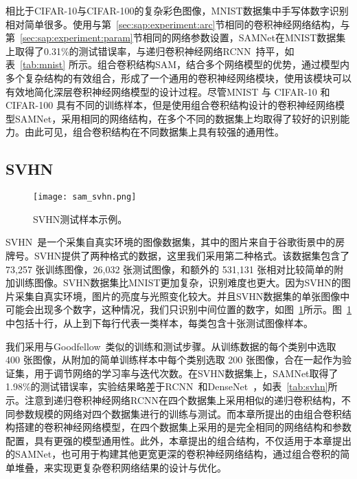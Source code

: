 相比于CIFAR-10与CIFAR-100的复杂彩色图像，MNIST数据集中手写体数字识别相对简单很多。使用与第~\ref{sec:sap:experiment:arc}节相同的卷积神经网络结构，与第~\ref{sec:sap:experiment:param}节相同的网络参数设置，SAMNet在MNIST数据集上取得了0.31\%的测试错误率，与递归卷积神经网络RCNN~\cite{liang2015recurrent}持平，如表~\ref{tab:mnist} 所示。组合卷积结构SAM，结合多个网络模型的优势，通过模型内多个复杂结构的有效组合，形成了一个通用的卷积神经网络模块，使用该模块可以有效地简化深层卷积神经网络模型的设计过程。尽管MNIST 与 CIFAR-10 和 CIFAR-100 具有不同的训练样本，但是使用组合卷积结构设计的卷积神经网络模型SAMNet，采用相同的网络结构，在多个不同的数据集上均取得了较好的识别能力。由此可见，组合卷积结构在不同数据集上具有较强的通用性。

\subsection{SVHN}
\label{sec:sap:experiment:svhn}

\begin{figure}[!h]
\centering
\texttt{[image: sam\_svhn.png]}
\caption{SVHN测试样本示例。}
\label{fig:sam_svhn}
\end{figure}

SVHN~\cite{netzer2011reading}是一个采集自真实环境的图像数据集，其中的图片来自于谷歌街景中的房牌号。SVHN提供了两种格式的数据，这里我们采用第二种格式。该数据集包含了 73,257 张训练图像，26,032 张测试图像，和额外的 531,131 张相对比较简单的附加训练图像。SVHN数据集比MNIST更加复杂，识别难度也更大。因为SVHN的图片采集自真实环境，图片的亮度与光照变化较大。并且SVHN数据集的单张图像中可能会出现多个数字，这种情况，我们只识别中间位置的数字，如图~\ref{fig:sam_svhn}所示。图~\ref{fig:sam_svhn}中包括十行，从上到下每行代表一类样本，每类包含十张测试图像样本。

我们采用与Goodfellow~\cite{goodfellow2013maxout}类似的训练和测试步骤。从训练数据的每个类别中选取 400 张图像，从附加的简单训练样本中每个类别选取 200 张图像，合在一起作为验证集，用于调节网络的学习率与迭代次数。在SVHN数据集上，SAMNet取得了1.98\%的测试错误率，实验结果略差于RCNN~\cite{liang2015recurrent}和DenseNet~\cite{huang2016densely}，如表~\ref{tab:svhn}所示。注意到递归卷积神经网络RCNN在四个数据集上采用相似的递归卷积结构，不同参数规模的网络对四个数据集进行的训练与测试。而本章所提出的由组合卷积结构搭建的卷积神经网络模型，在四个数据集上采用的是完全相同的网络结构和参数配置，具有更强的模型通用性。此外，本章提出的组合结构，不仅适用于本章提出的SAMNet，也可用于构建其他更宽更深的卷积神经网络结构，通过组合卷积的简单堆叠，来实现更复杂卷积网络结果的设计与优化。

